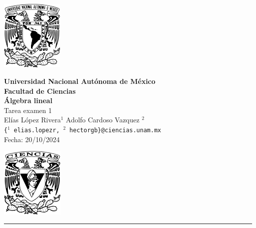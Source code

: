 \documentclass[11pt,letterpaper]{article}
\begin{document}

\begin{center}
    \begin{minipage}{3cm}
    	\begin{center}
    		\includegraphics[height=3.4cm]{logo_unam.png}
    	\end{center}
    \end{minipage}\hfill
    \begin{minipage}{10cm}
    	\begin{center}
    	\textbf{\large Universidad Nacional Autónoma de México}\\[0.1cm]
        \textbf{Facultad de Ciencias}\\[0.1cm]
        \textbf{\'Algebra lineal}\\[0.1cm]
        Tarea examen 1 \\[0.1cm]
         El\'ias L\'opez Rivera$^{1}$\,\,Adolfo Cardoso Vazquez $^{2}$\\[0.1cm]
    
        \texttt{\{$^{1}$ elias.lopezr,\,${^2}$\,hectorgb\}@ciencias.unam.mx }\\[0.1cm]
        Fecha:\,\,20/10/2024
    	\end{center}
    \end{minipage}\hfill
    \begin{minipage}{3cm}
    	\begin{center}
    		\includegraphics[height=3.4cm]{Logo_FC.png}
    	\end{center}
    \end{minipage}
\end{center}

\rule{17cm}{0.1mm}
\end{document}
